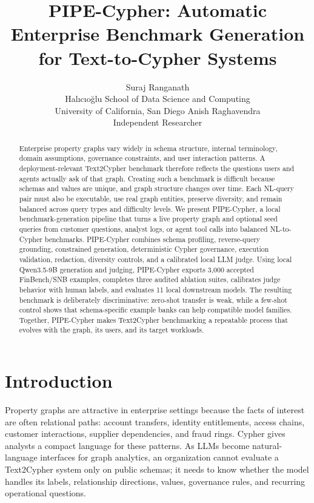 \documentclass[11pt]{article}
\title{PIPE-Cypher: Automatic Enterprise Benchmark Generation for Text-to-Cypher Systems}
\author{
Suraj Ranganath\\
Hal{\i}c{\i}o\u{g}lu School of Data Science and Computing\\
University of California, San Diego
\And
Anish Raghavendra\\
Independent Researcher
}
\begin{document}
\maketitle
\thispagestyle{firstpagefooter}

\begin{abstract}
Enterprise property graphs vary widely in schema structure, internal terminology, domain assumptions, governance constraints, and user interaction patterns. A deployment-relevant Text2Cypher benchmark therefore reflects the questions users and agents actually ask of that graph. Creating such a benchmark is difficult because schemas and values are unique, and graph structure changes over time. Each NL-query pair must also be executable, use real graph entities, preserve diversity, and remain balanced across query types and difficulty levels. We present PIPE-Cypher, a local benchmark-generation pipeline that turns a live property graph and optional seed queries from customer questions, analyst logs, or agent tool calls into balanced NL-to-Cypher benchmarks. PIPE-Cypher combines schema profiling, reverse-query grounding, constrained generation, deterministic Cypher governance, execution validation, redaction, diversity controls, and a calibrated local LLM judge. Using local Qwen3.5-9B generation and judging, PIPE-Cypher exports 3,000 accepted FinBench/SNB examples, completes three audited ablation suites, calibrates judge behavior with human labels, and evaluates 11 local downstream models. The resulting benchmark is deliberately discriminative: zero-shot transfer is weak, while a few-shot control shows that schema-specific example banks can help compatible model families. Together, PIPE-Cypher makes Text2Cypher benchmarking a repeatable process that evolves with the graph, its users, and its target workloads.
\end{abstract}

\section{Introduction}
Property graphs are attractive in enterprise settings because the facts of interest are often relational paths: account transfers, identity entitlements, access chains, customer interactions, supplier dependencies, and fraud rings. Cypher gives analysts a compact language for these patterns. As LLMs become natural-language interfaces for graph analytics, an organization cannot evaluate a Text2Cypher system only on public schemas; it needs to know whether the model handles its labels, relationship directions, values, governance rules, and recurring operational questions.
\end{document}
